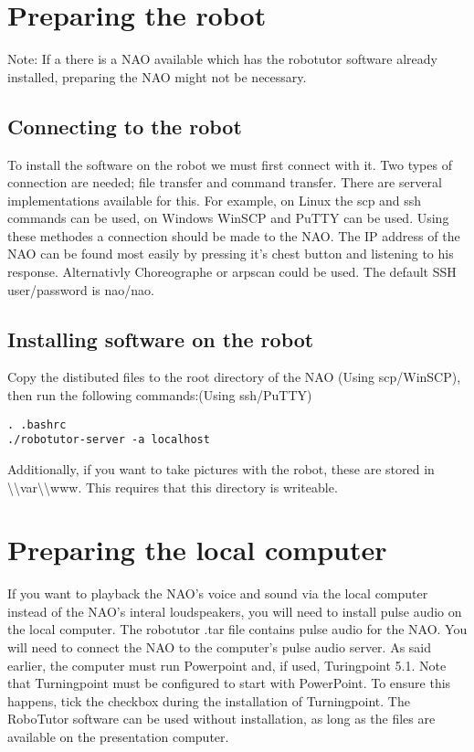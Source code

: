 
\section{Preparing the robot}
Note: If a there is a NAO available which has the robotutor software already installed, preparing the NAO might not be necessary.

\subsection{Connecting to the robot}
To install the software on the robot we must first connect with it. Two types of connection are needed; file transfer and command transfer. There are serveral implementations available for this. For example, on Linux the scp and ssh commands can be used, on Windows WinSCP and PuTTY can be used. Using these methodes a connection should be made to the NAO. The IP address of the NAO can be found most easily by pressing it's chest button and listening to his response. Alternativly Choreographe or arpscan could be used. The default SSH user/password is nao/nao. 

\subsection{Installing software on the robot}

Copy the distibuted files to the root directory of the NAO (Using scp/WinSCP), then run the following commands:(Using ssh/PuTTY)
\begin{verbatim}
. .bashrc
./robotutor-server -a localhost
\end{verbatim}
Additionally, if you want to take pictures with the robot, these are stored in \textbackslash\textbackslash var\textbackslash\textbackslash www. This requires that this directory is writeable.

\section{Preparing the local computer}
If you want to playback the NAO's voice and sound via the local computer instead of the NAO's interal loudspeakers, you will need to install pulse audio on the local computer. The robotutor .tar file contains pulse audio for the NAO. You will need to connect the NAO to the computer's pulse audio server. As said earlier, the computer must run Powerpoint and, if used, Turingpoint 5.1. Note that Turningpoint must be configured to start with PowerPoint. To ensure this happens, tick the checkbox during the installation of Turningpoint. The RoboTutor software can be used without installation, as long as the files are available on the presentation computer.

